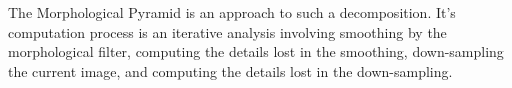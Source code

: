 The Morphological Pyramid is an approach to such a
decomposition. It's computation process is an iterative analysis
involving smoothing by the morphological filter, computing the
details lost in the smoothing, down-sampling the current image, and
computing the details lost in the down-sampling.







